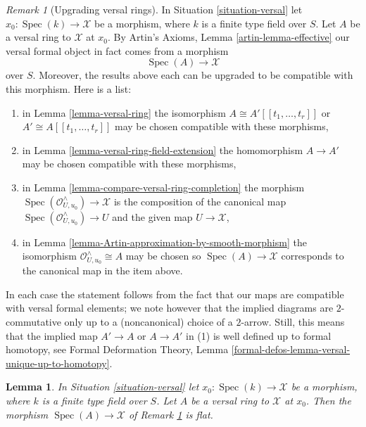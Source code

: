 \documentclass{stacks-project}
\theoremstyle{plain}
\newtheorem{lemma}[subsection]{Lemma}
\theoremstyle{definition}
\theoremstyle{remark}
\newtheorem{remark}[subsection]{Remark}
\numberwithin{equation}{subsection}
\def\Spec{\mathop{\mathrm{Spec}}}
\begin{document}
\begin{remark}[Upgrading versal rings]
\label{remark-upgrade}
In Situation \ref{situation-versal} let $x_0 : \Spec(k) \to \mathcal{X}$
be a morphism, where $k$ is a finite type field over $S$.
Let $A$ be a versal ring to $\mathcal{X}$ at $x_0$. By Artin's Axioms,
Lemma \ref{artin-lemma-effective} our versal formal object
in fact comes from a morphism
$$
\Spec(A) \longrightarrow \mathcal{X}
$$
over $S$. Moreover, the results above each can be upgraded to be compatible
with this morphism. Here is a list:
\begin{enumerate}
\item in Lemma \ref{lemma-versal-ring} the isomorphism
$A \cong A'[[t_1, \ldots, t_r]]$ or $A' \cong A[[t_1, \ldots, t_r]]$
may be chosen compatible with these morphisms,
\item in Lemma \ref{lemma-versal-ring-field-extension} the
homomorphism $A \to A'$ may be chosen compatible with these morphisms,
\item in Lemma \ref{lemma-compare-versal-ring-completion}
the morphism $\Spec(\mathcal{O}_{U, u_0}^\wedge) \to \mathcal{X}$
is the composition of the canonical map
$\Spec(\mathcal{O}_{U, u_0}^\wedge) \to U$ and the given map
$U \to \mathcal{X}$,
\item in Lemma \ref{lemma-Artin-approximation-by-smooth-morphism}
the isomorphism $\mathcal{O}_{U, u_0}^\wedge \cong A$ may
be chosen so $\Spec(A) \to \mathcal{X}$ corresponds to the canonical map
in the item above.
\end{enumerate}
In each case the statement follows from the fact that our maps are
compatible with versal formal elements; we note however that the
implied diagrams are $2$-commutative only up to a (noncanonical)
choice of a $2$-arrow. Still, this means that the implied map $A' \to A$
or $A \to A'$ in (1) is well defined up to formal homotopy, see
Formal Deformation Theory, Lemma
\ref{formal-defos-lemma-versal-unique-up-to-homotopy}.
\end{remark}

\begin{lemma}
\label{lemma-versal-ring-flat}
In Situation \ref{situation-versal} let $x_0 : \Spec(k) \to \mathcal{X}$
be a morphism, where $k$ is a finite type field over $S$.
Let $A$ be a versal ring to $\mathcal{X}$ at $x_0$.
Then the morphism $\Spec(A) \to \mathcal{X}$ of
Remark \ref{remark-upgrade} is flat.
\end{lemma}
\end{document}
